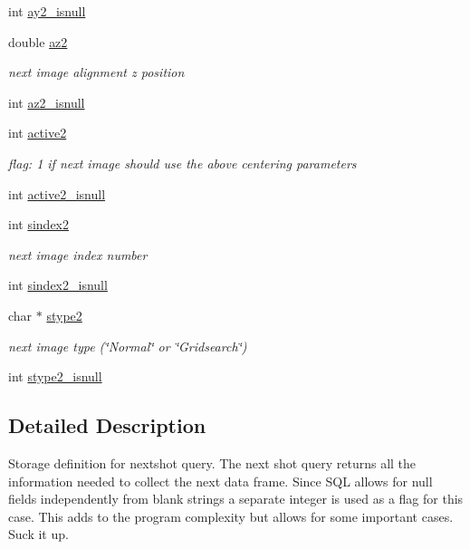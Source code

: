 \begin{DoxyCompactItemize}
int \hyperlink{structlspg__nextshot__struct_ad0f50ec6339296d3d39c8d95131ab6b5}{ay2\_\-isnull}
\item 
double \hyperlink{structlspg__nextshot__struct_a94698a030fd5b2abf1f10a2ad33476a4}{az2}
\begin{DoxyCompactList}\small\item\em next image alignment z position \item\end{DoxyCompactList}\item 
int \hyperlink{structlspg__nextshot__struct_a95d080f13a4e02b9aa883821ee3e721c}{az2\_\-isnull}
\item 
int \hyperlink{structlspg__nextshot__struct_a2875aa18df587806a3d8c05220fd62b5}{active2}
\begin{DoxyCompactList}\small\item\em flag: 1 if next image should use the above centering parameters \item\end{DoxyCompactList}\item 
int \hyperlink{structlspg__nextshot__struct_a1aa11ff4a4c8d69695786b4349e84e6b}{active2\_\-isnull}
\item 
int \hyperlink{structlspg__nextshot__struct_ae9d0cfdff6868e0ba9cd5acafbe133db}{sindex2}
\begin{DoxyCompactList}\small\item\em next image index number \item\end{DoxyCompactList}\item 
int \hyperlink{structlspg__nextshot__struct_a28e0b5c32a2741ef22edeb9d35b04e4d}{sindex2\_\-isnull}
\item 
char $\ast$ \hyperlink{structlspg__nextshot__struct_ae08ef74ea76e6e099a3ff6c7f845d337}{stype2}
\begin{DoxyCompactList}\small\item\em next image type (\char`\"{}Normal\char`\"{} or \char`\"{}Gridsearch\char`\"{}) \item\end{DoxyCompactList}\item 
int \hyperlink{structlspg__nextshot__struct_a203e29ed0bb403aaab6d7f95f690cc0d}{stype2\_\-isnull}
\end{DoxyCompactItemize}


\subsection{Detailed Description}
Storage definition for nextshot query. The next shot query returns all the information needed to collect the next data frame. Since SQL allows for null fields independently from blank strings a separate integer is used as a flag for this case. This adds to the program complexity but allows for some important cases. Suck it up. 

